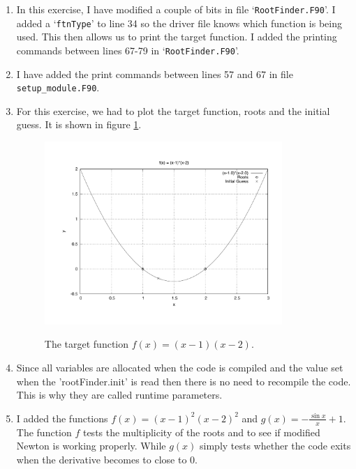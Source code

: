 \documentclass[12pt]{article}
\begin{document}
\begin{enumerate}
	\item In this exercise, I have modified a couple of bits in file `\texttt{RootFinder.F90}'. I added a `\texttt{ftnType}' to line 34 so the driver file knows which function is being used. This then allows us to print the target function. I added the printing commands between lines 67-79 in `\texttt{RootFinder.F90}'.
	
	\item I have added the print commands between lines 57 and 67 in file \texttt{setup\_module.F90}.
	
	\item For this exercise, we had to plot the target function, roots and the initial guess. It is shown in figure \ref{fig:plot2dot3}.
			\begin{figure}[h]
				\caption{The target function $f(x) = (x-1)(x-2)$.}
				\centering
				\includegraphics[width=0.85\textwidth]{./problem2_3.pdf}
				\label{fig:plot2dot3}
			\end{figure}
	
	\item Since all variables are allocated when the code is compiled and the value set when the 'rootFinder.init' is read then there is no need to recompile the code. This is why they are called runtime parameters.
	
	
	\item I added the functions $f(x) = (x-1)^2 (x-2)^2$ and $g(x) = -\frac{\sin x}{x} + 1$. The function $f$ tests the multiplicity of the roots and to see if modified Newton is working properly. While $g(x)$ simply tests whether the code exits when the derivative becomes to close to 0.
	

\end{enumerate}
\end{document}
